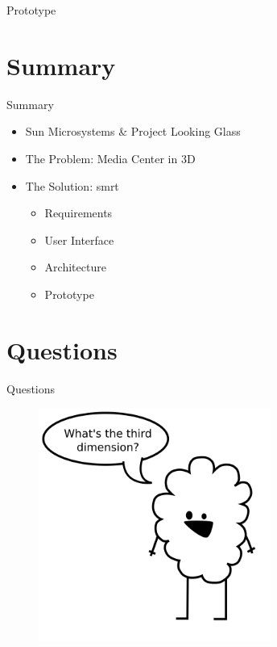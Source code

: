 \documentclass[style=smrt,mode=present,paper=screen]{powerdot}
\begin{document}

\begin{slide}{Prototype}
\end{slide}


\section[slide=false]{Summary}
\begin{slide}[toc=,bm=]{Summary}
\begin{itemize}
\item Sun Microsystems \& Project Looking Glass
\item The Problem: Media Center in 3D
\item The Solution: smrt \\
\begin{itemize}
	\item Requirements
	\item User Interface
	\item Architecture
	\item Prototype
\end{itemize}
\end{itemize}
\end{slide}

\presenter{}
\section[slide=false]{Questions}
\begin{slide}[toc=,bm=]{Questions}
\begin{figure}[htb]
	\includegraphics[width=3in]{../lib/figures/fishstick}
\end{figure}
\end{slide}
\end{document}
